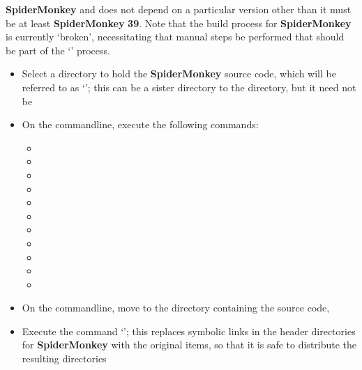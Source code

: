 \textbf{SpiderMonkey} and does not depend on a particular version \longDash{} other than
it must be at least \textbf{SpiderMonkey} \textbf{39}.
Note that the build process for \textbf{SpiderMonkey} is currently `broken', necessitating
that manual steps be performed that should be part of the `' process.
\begin{itemize}
\item Select a directory to hold the \textbf{SpiderMonkey} source code, which will be
referred to as `'; this can be a sister directory to the
 directory, but it need not be
\item\exSp{}On the command\longDash{}line, execute the following commands:
\begin{itemize}
\item {}
\item\exSp{}
\item\exSp{}
\item\exSp{}
\item\exSp{}
\item\exSp{}
\item\exSp{}
\item\exSp{}
\item\exSp{}
\item\exSp{}
\item\exSp{}
\end{itemize}
\item\exSp{}On the command\longDash{}line, move to the directory containing the \mplusm{}
source code, 
\item\exSp{}Execute the command `'; this replaces symbolic links in the
header directories for \textbf{SpiderMonkey} with the original items, so that it is safe
to distribute the resulting directories
\end{itemize}
